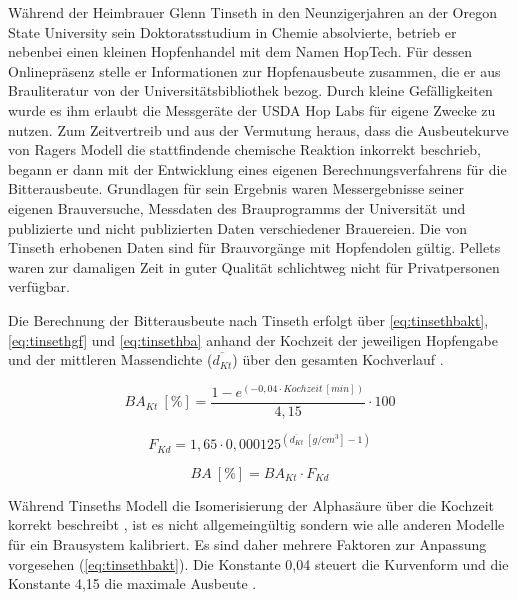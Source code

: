 \documentclass[a4paper,parskip=half]{scrartcl}
\newcommand{\BA}{\mathit{BA}}
\newcommand{\BAKt}{{\mathit{BA}}_{\mathit{Kt}}}
\newcommand{\umin}{\:[\mathit{min}]}
\newcommand{\uden}{\:[\mathit{g/cm^3}]}
\newcommand{\uper}{\:[\%]}
\newcommand{\FKd}{F_{\mathit{Kd}}}
\newcommand{\dKt}{\overline{d_{\mathit{Kt}}}}
\begin{document}
Während der Heimbrauer Glenn Tinseth in den Neunzigerjahren an
der Oregon State University sein Doktoratsstudium in Chemie absolvierte,
betrieb er nebenbei einen kleinen Hopfenhandel mit dem Namen HopTech.
Für dessen
Onlinepräsenz stelle er Informationen zur Hopfenausbeute zusammen,
die er aus Brauliteratur von der Universitätsbibliothek bezog.
Durch kleine Gefälligkeiten wurde es ihm erlaubt die Messgeräte
der USDA Hop Labs für eigene Zwecke zu nutzen. Zum Zeitvertreib
und aus der Vermutung heraus, dass die Ausbeutekurve von Ragers
Modell die stattfindende
chemische Reaktion inkorrekt beschrieb, begann er dann mit
der Entwicklung eines eigenen Berechnungsverfahrens für die
Bitterausbeute. Grundlagen für sein Ergebnis waren Messergebnisse
seiner eigenen Brauversuche, Messdaten des Brauprogramms der
Universität und publizierte und nicht publizierten Daten verschiedener
Brauereien. Die von Tinseth erhobenen Daten sind für
Brauvorgänge mit Hopfendolen gültig. Pellets waren zur
damaligen Zeit in guter Qualität schlichtweg nicht für Privatpersonen
verfügbar. \parencites[0:55:45-1:08:00]{Beechum2017a}[2:10-6:30]{Smith2011}

Die Berechnung der Bitterausbeute nach Tinseth erfolgt über
\autoref{eq:tinsethbakt}, \autoref{eq:tinsethgf} und \autoref{eq:tinsethba}
anhand der Kochzeit der jeweiligen Hopfengabe und der mittleren
Massendichte ($\dKt$) über den gesamten Kochverlauf \parencite{Tinseth1997}.

\begin{equation}
\BAKt \uper = \frac{1 - e^{\left(-0,04 \cdot \mathit{Kochzeit} \umin \right)}}{4,15} \cdot 100
\label{eq:tinsethbakt}
\end{equation}

\begin{equation}
\FKd = 1,65 \cdot 0,000125^{\left(\overline{d_{\mathit{Kt}}} \uden - 1 \right)}
\label{eq:tinsethgf}
\end{equation}

\begin{equation}
\BA \uper = \BAKt \cdot \FKd
\label{eq:tinsethba}
\end{equation}



Während Tinseths Modell die Isomerisierung der Alphasäure über
die Kochzeit korrekt beschreibt \parencite[43]{Malowicki2005}, ist es
nicht allgemeingültig sondern wie alle anderen Modelle für ein
Brausystem kalibriert. Es sind daher mehrere Faktoren zur Anpassung
vorgesehen (\autoref{eq:tinsethbakt}). Die Konstante 0,04 steuert die
Kurvenform und die Konstante 4,15  die maximale Ausbeute
\parencite{Tinseth1997}.
\end{document}
